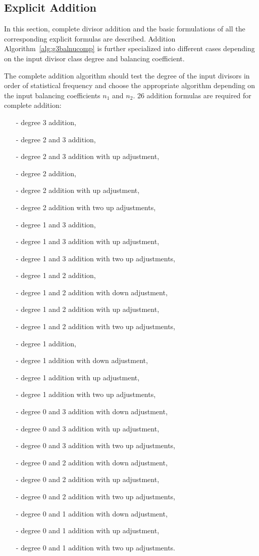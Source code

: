 \subsection{Explicit Addition}\label{sec:g3SPLITADD}
In this section, complete divisor addition and the basic formulations of all the
corresponding explicit formulas are described. Addition 
Algorithm~\ref{alg:g3balnucomp} is further specialized into different cases
depending on the input divisor class degree and balancing coefficient.

The complete addition algorithm should test the degree of the input divisors in
order of statistical frequency and choose the appropriate algorithm depending on
the input balancing coefficients $n_1$ and $n_2$. 26 addition formulas are
required for complete addition:
\begin{itemize}
    \item[-] degree 3 addition,
    \item[-] degree 2 and 3 addition,
    \item[-] degree 2 and 3 addition with up adjustment,
    \item[-] degree 2 addition,
    \item[-] degree 2 addition with up adjustment,
    \item[-] degree 2 addition with two up adjustments, 
    \item[-] degree 1 and 3 addition,  
    \item[-] degree 1 and 3 addition with up adjustment,
    \item[-] degree 1 and 3 addition with two up adjustments,  
    \item[-] degree 1 and 2 addition,
    \item[-] degree 1 and 2 addition with down adjustment,   
    \item[-] degree 1 and 2 addition with up adjustment,
    \item[-] degree 1 and 2 addition with two up adjustments, 
    \item[-] degree 1 addition,
    \item[-] degree 1 addition with down adjustment,
    \item[-] degree 1 addition with up adjustment,
    \item[-] degree 1 addition with two up adjustments, 
    \item[-] degree 0 and 3 addition with down adjustment,
    \item[-] degree 0 and 3 addition with up adjustment,
    \item[-] degree 0 and 3 addition with two up adjustments,  
    \item[-] degree 0 and 2 addition with down adjustment,
    \item[-] degree 0 and 2 addition with up adjustment,
    \item[-] degree 0 and 2 addition with two up adjustments, 
    \item[-] degree 0 and 1 addition with down adjustment,
    \item[-] degree 0 and 1 addition with up adjustment, 
    \item[-] degree 0 and 1 addition with two up adjustments.  
\end{itemize}
